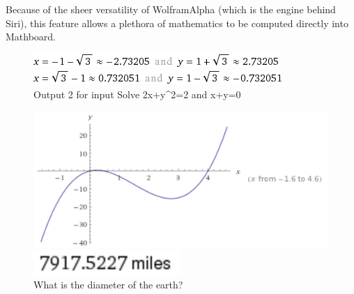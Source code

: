 Because of the sheer versatility of WolframAlpha (which is the engine behind Siri), this feature allows a plethora of mathematics to be computed directly into Mathboard.

\begin{figure}[!bp]
  \centering
  \begin{minipage}[b]{0.4\textwidth}
    \includegraphics[width=\textwidth]{figures/fig1a.png}
    \caption{Output 1 for input Solve 2x+y\textasciicircum2=2 and x+y=0}
  \end{minipage}
  \hfill
  \begin{minipage}[b]{0.4\textwidth}
    \includegraphics[width=\textwidth]{figures/fig1b.png}
    \caption{Output 2 for input Solve 2x+y\textasciicircum2=2 and x+y=0}
  \end{minipage}
\end{figure}

\begin{figure}[!bp]
  \centering
  \begin{minipage}[b]{0.4\textwidth}
    \includegraphics[width=\textwidth]{figures/fig2.png}
    \caption{Plot y=2x\textasciicircum3-9x\textasciicircum2+4x}
  \end{minipage}
  \hfill
  \begin{minipage}[b]{0.4\textwidth}
    \includegraphics[width=0.5\textwidth]{figures/fig3.png}
    \caption{What is the diameter of the earth?}
  \end{minipage}
\end{figure}
